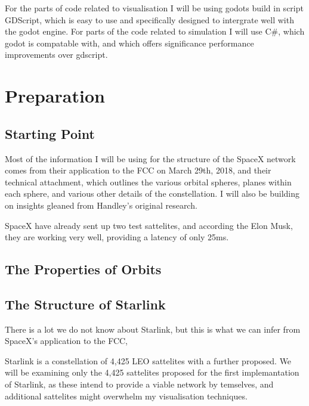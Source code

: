 \documentclass[12pt]{article}
\begin{document}
For the parts of code related to visualisation I will be using godots build in script GDScript, which is easy to use and specifically designed to intergrate well with the godot engine. For parts of the code related to simulation I will use C\#, which godot is compatable with, and which offers significance performance improvements over gdscript.

\section{Preparation}




\subsection{Starting Point}

Most of the information I will be using for the structure of the SpaceX network comes from their application to the FCC on March 29th, 2018\cite{FCCApplication}, and their technical attachment\cite{TechnicalAttachment}, which outlines the various orbital spheres, planes within each sphere, and various other details of the constellation. I will also be building on insights gleaned from Handley's original research.




SpaceX have already sent up two test sattelites, and according the Elon Musk, they are working very well, providing a latency of only 25ms\cite{ElonMuskTweet}.


\subsection{The Properties of Orbits}


\subsection{The Structure of Starlink}

There is a lot we do not know about Starlink, but this is what we can infer from SpaceX’s application to the FCC\cite{FCCApplication}, 

Starlink is a constellation of 4,425 LEO sattelites with a further proposed. %
We will be examining only the 4,425 sattelites proposed for the first implemantation of Starlink, as these intend to provide a viable network by temselves, and additional sattelites might overwhelm my visualisation techniques. 
\end{document}
